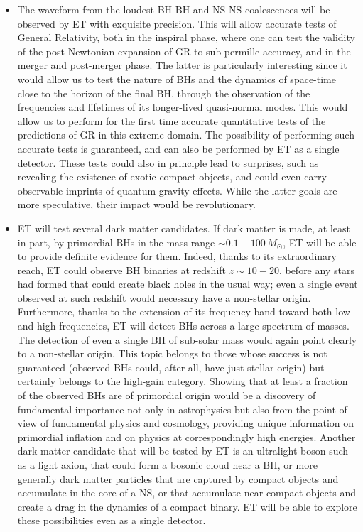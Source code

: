 \begin{itemize}
\vspace{1mm}

\item The waveform from the loudest BH-BH and NS-NS coalescences will be observed by 
ET with exquisite precision. This will allow accurate tests of General Relativity, both in the inspiral phase, where one can test the validity of the post-Newtonian expansion of GR to sub-permille accuracy, and in the merger and post-merger phase. The latter is particularly interesting since it would allow us to test the nature of BHs and the dynamics of space-time close to the horizon of the final BH, through the observation of  the frequencies and lifetimes of its longer-lived quasi-normal modes. This would allow us to perform for the first time accurate quantitative tests of the predictions of GR in this extreme domain. The possibility of performing such accurate tests is guaranteed, and can also  be performed by ET as a single detector. These tests could also in principle lead to  surprises, such as revealing  the existence of exotic compact objects, and could even carry observable imprints of quantum gravity effects. While the latter goals are more speculative, their impact would be revolutionary.

\vspace{1mm}

\item ET will test several dark matter candidates. If dark matter is made, at least in part, by primordial BHs in the mass range $\sim 0.1 - 100\,M_\odot$, ET will be able to provide definite evidence for them. Indeed, thanks to its extraordinary reach, ET could observe BH binaries at redshift  $z\sim 10-20$, before
any stars had formed that could create black holes in the usual way; even a single event observed at such redshift would necessary have a non-stellar origin. Furthermore, thanks to the extension of its frequency band toward both  low and high frequencies, ET will detect  BHs across a large spectrum of masses. The detection of even a  single BH of sub-solar mass would again point clearly to a non-stellar origin. This topic belongs to those whose success is not guaranteed (observed BHs could, after all, have just stellar origin) but certainly belongs to the high-gain category. Showing that at least a fraction of the observed BHs are of primordial origin would be a discovery of fundamental importance not only in astrophysics but also from the point of view of fundamental physics and cosmology, providing unique information on primordial inflation and on physics at correspondingly high energies. Another dark matter candidate that will be tested by ET is an ultralight boson such as a  light axion, that could form a bosonic cloud near a BH,
or more generally dark matter particles that are captured by compact objects and accumulate in the core of a NS, or that accumulate near compact objects and create a drag in the dynamics of a compact binary.
 ET will be able to explore these possibilities even as a single detector.  


\end{itemize}
